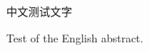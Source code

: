 
\begin{cabstract}
	 中文测试文字
\end{cabstract}

\begin{eabstract}
	Test of the English abstract.
\end{eabstract}

